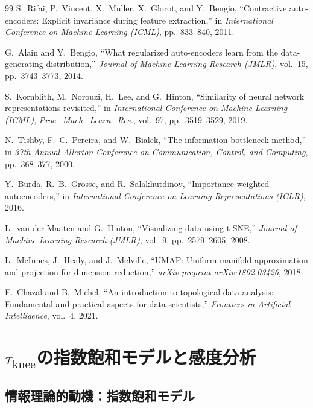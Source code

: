 \documentclass[12pt,a4paper]{jsarticle}
\begin{document}
\begin{thebibliography}{99}
S.~Rifai, P.~Vincent, X.~Muller, X.~Glorot, and Y.~Bengio,
``Contractive auto-encoders: Explicit invariance during feature extraction,''
in \textit{International Conference on Machine Learning (ICML)},
pp.~833--840, 2011.

G.~Alain and Y.~Bengio,
``What regularized auto-encoders learn from the data-generating distribution,''
\textit{Journal of Machine Learning Research (JMLR)}, vol.~15, pp.~3743--3773, 2014.

S.~Kornblith, M.~Norouzi, H.~Lee, and G.~Hinton,
``Similarity of neural network representations revisited,''
in \textit{International Conference on Machine Learning (ICML)},
\textit{Proc.~Mach.~Learn.~Res.}, vol.~97, pp.~3519--3529, 2019.

N.~Tishby, F.~C.~Pereira, and W.~Bialek,
``The information bottleneck method,''
in \textit{37th Annual Allerton Conference on Communication, Control, and Computing},
pp.~368--377, 2000.

Y.~Burda, R.~B.~Grosse, and R.~Salakhutdinov,
``Importance weighted autoencoders,''
in \textit{International Conference on Learning Representations (ICLR)}, 2016.

L.~van der Maaten and G.~Hinton,
``Visualizing data using t-SNE,''
\textit{Journal of Machine Learning Research (JMLR)}, vol.~9,
pp.~2579--2605, 2008.

L.~McInnes, J.~Healy, and J.~Melville,
``UMAP: Uniform manifold approximation and projection for dimension reduction,''
\textit{arXiv preprint arXiv:1802.03426}, 2018.

F.~Chazal and B.~Michel,
``An introduction to topological data analysis: Fundamental and practical aspects
for data scientists,''
\textit{Frontiers in Artificial Intelligence}, vol.~4, 2021.

\end{thebibliography}

\appendix

\section{$\tau_{\mathrm{knee}}$の指数飽和モデルと感度分析}\label{app:tau_knee}

\subsection*{情報理論的動機：指数飽和モデル}
\end{document}
